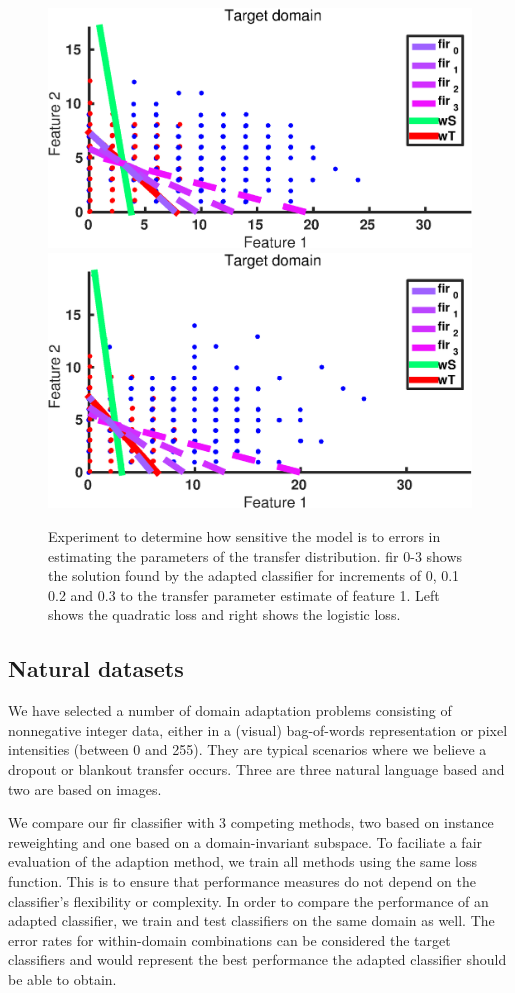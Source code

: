 \documentclass[twoside,11pt]{article}
\begin{document}
\begin{figure}[ht]
	\centering
	\includegraphics[width=.45\textwidth]{images/da_artexp_sens_params_square.eps} \hspace{5px}
	\includegraphics[width=.45\textwidth]{images/da_artexp_sens_params_log.eps} 
	\caption{Experiment to determine how sensitive the model is to errors in estimating the parameters of the transfer distribution. fir 0-3 shows the solution found by the adapted classifier for increments of 0, 0.1 0.2 and 0.3 to the transfer parameter estimate of feature 1. Left shows the quadratic loss and right shows the logistic loss.}
	\label{sens_params}
\end{figure}

\subsection{Natural datasets}
We have selected a number of domain adaptation problems consisting of nonnegative integer data, either in a (visual) bag-of-words representation or pixel intensities (between 0 and 255). They are typical scenarios where we believe a dropout or blankout transfer occurs. Three are three natural language based and two are based on images.

We compare our fir classifier with 3 competing methods, two based on instance reweighting and one based on a domain-invariant subspace. To faciliate a fair evaluation of the adaption method, we train all methods using the same loss function. This is to ensure that performance measures do not depend on the classifier's flexibility or complexity. In order to compare the performance of an adapted classifier, we train and test classifiers on the same domain as well. The error rates for within-domain combinations can be considered the target classifiers and would represent the best performance the adapted classifier should be able to obtain.
\end{document}
